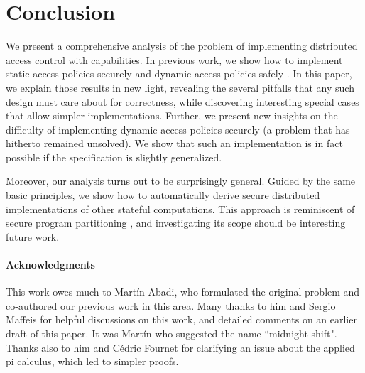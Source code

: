 \documentclass[10pt]{article}
\begin{document}
\section{Conclusion}
\noindent
We present a comprehensive analysis of the problem of implementing distributed access control with capabilities. In previous work, we show how to implement static access policies securely \cite{ChaudhuriAbadi-FMSE05} and dynamic access policies safely \cite{ForteChaudhuriA06}. In this paper, we explain those results in new light, revealing the several pitfalls that any such design must care about for correctness, while discovering interesting special cases that allow simpler implementations. Further, we present new insights on the difficulty of implementing dynamic access policies securely (a problem that has hitherto remained unsolved). We show that such an implementation is in fact possible if the specification is slightly generalized. 

Moreover, our analysis turns out to be surprisingly general. Guided by the same basic principles, we show how to automatically derive secure distributed implementations of other stateful computations. This approach is reminiscent of secure program partitioning \cite{spp}, and investigating its scope should be interesting future work.

\paragraph{Acknowledgments}
This work owes much to Mart\'in Abadi, who formulated the original problem and co-authored our previous work in this area. Many thanks to him and Sergio Maffeis for helpful discussions on this work, and detailed comments on an earlier draft of this paper. It was Mart\'in who suggested the name ``midnight-shift". Thanks also to him and C\'edric Fournet for clarifying an issue about the applied pi calculus, which led to simpler proofs.




















 
\end{document}
